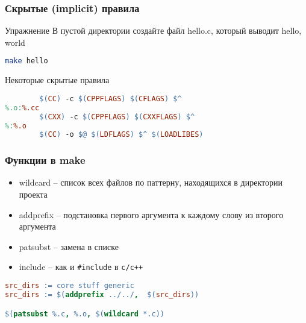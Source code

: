 \begin{frame}[fragile]
\frametitle{Скрытые (implicit) правила}
\begin{block}{Упражнение}
В пустой директории создайте файл hello.c, который выводит hello, world
\begin{lstlisting}[language=bash]
make hello
\end{lstlisting}
\end{block}
\pause
\begin{center}
Некоторые скрытые правила
\end{center}
\begin{lstlisting}[language=make]
%.o:%.c
        $(CC) -c $(CPPFLAGS) $(CFLAGS) $^
%.o:%.cc
        $(CXX) -c $(CPPFLAGS) $(CXXFLAGS) $^
%:%.o
        $(CC) -o $@ $(LDFLAGS) $^ $(LOADLIBES) 
\end{lstlisting}
\end{frame}
\begin{frame}[fragile]
	\frametitle{Функции в make}

	\begin{itemize}
		\item wildcard -- список всех файлов по паттерну,  находящихся в директории проекта
		\item addprefix -- подстановка первого аргумента к каждому слову из второго аргумента
		\item patsubst -- замена в списке
		\item include -- как и {\tt \#include} в {\tt c/c++}
	\end{itemize}

	\begin{lstlisting}[language=make]
src_dirs := core stuff generic
src_dirs := $(addprefix ../../,  $(src_dirs))

$(patsubst %.c, %.o, $(wildcard *.c))
	\end{lstlisting}

\end{frame}

